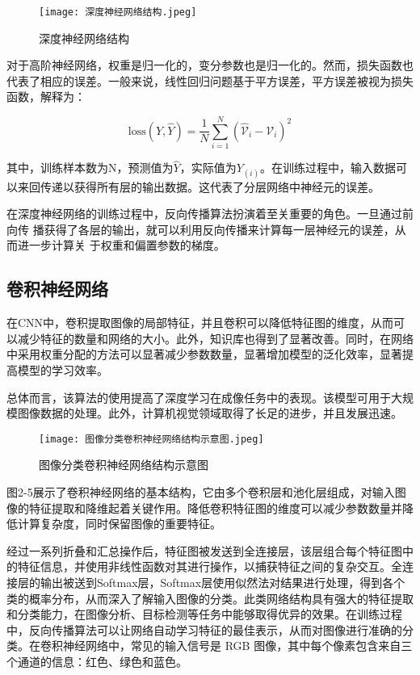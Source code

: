 \begin{figure}[hbt]
	\centering
	\texttt{[image: 深度神经网络结构.jpeg]}
	\caption{深度神经网络结构}
	\label{f.example}
\end{figure}

对于高阶神经网络，权重是归一化的，变分参数也是归一化的。然而，损失函数也代表了相应的误差。一般来说，线性回归问题基于平方误差，平方误差被视为损失函数，解释为：

\[
\text{loss}(Y, \hat{Y}) = \frac{1}{N} \sum_{i=1}^{N} \left( \hat{\mathcal{V}}_i - \mathcal{V}_i \right)^2
\]

其中，训练样本数为N，预测值为$\hat{Y}$，实际值为$Y_(i)$。在训练过程中，输入数据可以来回传递以获得所有层的输出数据。这代表了分层网络中神经元的误差。

在深度神经网络的训练过程中，反向传播算法扮演着至关重要的角色。一旦通过前向传
播获得了各层的输出，就可以利用反向传播来计算每一层神经元的误差，从而进一步计算关
于权重和偏置参数的梯度。

\subsection{卷积神经网络}

在CNN中，卷积提取图像的局部特征，并且卷积可以降低特征图的维度，从而可以减少特征的数量和网络的大小。此外，知识库也得到了显著改善。同时，在网络中采用权重分配的方法可以显著减少参数数量，显著增加模型的泛化效率，显著提高模型的学习效率。

总体而言，该算法的使用提高了深度学习在成像任务中的表现。该模型可用于大规模图像数据的处理。此外，计算机视觉领域取得了长足的进步，并且发展迅速。

\begin{figure}[hbt]
	\centering
	\texttt{[image: 图像分类卷积神经网络结构示意图.jpeg]}
	\caption{图像分类卷积神经网络结构示意图}
	\label{f.example}
\end{figure}

图2-5展示了卷积神经网络的基本结构，它由多个卷积层和池化层组成，对输入图像的特征提取和降维起着关键作用。降低卷积特征图的维度可以减少参数数量并降低计算复杂度，同时保留图像的重要特征。

经过一系列折叠和汇总操作后，特征图被发送到全连接层，该层组合每个特征图中的特征信息，并使用非线性函数对其进行操作，以捕获特征之间的复杂交互。全连接层的输出被送到Softmax层，Softmax层使用似然法对结果进行处理，得到各个类的概率分布，从而深入了解输入图像的分类。此类网络结构具有强大的特征提取和分类能力，在图像分析、目标检测等任务中能够取得优异的效果。在训练过程中，反向传播算法可以让网络自动学习特征的最佳表示，从而对图像进行准确的分类。在卷积神经网络中，常见的输入信号是 RGB 图像，其中每个像素包含来自三个通道的信息：红色、绿色和蓝色。

